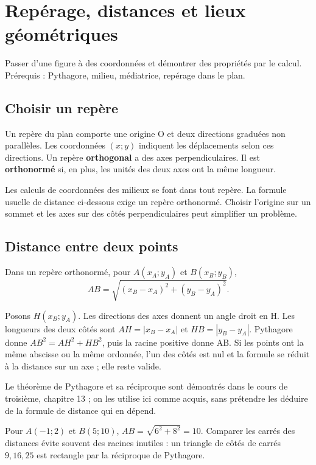 \documentclass[../cours_2de.tex]{subfiles}
\begin{document}
\setcounter{chapter}{6}
\chapter{Repérage, distances et lieux géométriques}
\label{sec:ch07}
\begin{objectif}
Passer d'une figure à des coordonnées et démontrer des propriétés par le calcul. Prérequis : Pythagore, milieu, médiatrice, repérage dans le plan.
\end{objectif}
\section{Choisir un repère}
Un repère du plan comporte une origine O et deux directions graduées non parallèles. Les coordonnées $(x;y)$ indiquent les déplacements selon ces directions. Un repère \textbf{orthogonal} a des axes perpendiculaires. Il est \textbf{orthonormé} si, en plus, les unités des deux axes ont la même longueur.

Les calculs de coordonnées des milieux se font dans tout repère. La formule usuelle de distance ci-dessous exige un repère orthonormé. Choisir l'origine sur un sommet et les axes sur des côtés perpendiculaires peut simplifier un problème.
\section{Distance entre deux points}
\begin{theoreme}
Dans un repère orthonormé, pour $A(x_A;y_A)$ et $B(x_B;y_B)$,
\[
AB=\sqrt{(x_B-x_A)^2+(y_B-y_A)^2}.
\]
\end{theoreme}
\begin{demonstration}
Posons $H(x_B;y_A)$. Les directions des axes donnent un angle droit en H. Les longueurs des deux côtés sont $AH=|x_B-x_A|$ et $HB=|y_B-y_A|$. Pythagore donne $AB^2=AH^2+HB^2$, puis la racine positive donne AB. Si les points ont la même abscisse ou la même ordonnée, l'un des côtés est nul et la formule se réduit à la distance sur un axe ; elle reste valide.
\end{demonstration}
\begin{center}
\end{center}
Le théorème de Pythagore et sa réciproque sont démontrés dans le cours de troisième, chapitre 13 ; on les utilise ici comme acquis, sans prétendre les déduire de la formule de distance qui en dépend.
\begin{exemple}
Pour $A(-1;2)$ et $B(5;10)$, $AB=\sqrt{6^2+8^2}=10$. Comparer les carrés des distances évite souvent des racines inutiles : un triangle de côtés de carrés $9,16,25$ est rectangle par la réciproque de Pythagore.
\end{exemple}
\end{document}
